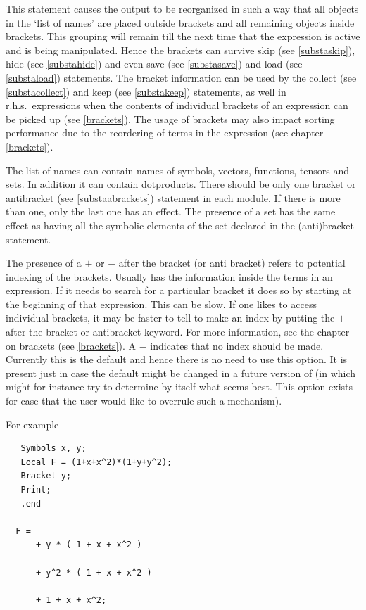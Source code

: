 \noindent This statement causes the output to be reorganized in such a way 
that all objects in the `list of names' are placed outside 
brackets and all remaining objects inside 
brackets. This grouping will remain till the next time that 
the expression is active and is being manipulated. Hence the brackets can 
survive skip (see \ref{substaskip}), hide (see \ref{substahide}) and even 
save (see \ref{substasave}) and load (see \ref{substaload}) statements. The 
bracket information can be used by the collect (see \ref{substacollect}) 
and keep (see \ref{substakeep}) statements, as well in r.h.s.\ expressions 
when the contents of individual brackets of an expression can be picked up 
(see \ref{brackets}). The usage of brackets may also impact sorting
performance due to the reordering of terms in the expression (see 
chapter \ref{brackets}). \vspace{4mm}

\noindent The list of names can contain names of symbols, vectors, 
functions, tensors and sets. In addition it can contain dotproducts. There 
should be only one bracket or antibracket (see \ref{substaabrackets}) 
statement in each module. If there is more than one, only the last one has 
an effect. The presence of a set has the same effect as having all the 
symbolic elements of the set declared in the (anti)bracket 
statement.\vspace{4mm}

\noindent The presence of a $+$ or $-$ after the bracket (or anti bracket) 
refers to potential indexing of the brackets. 
Usually {\FORM} has the information inside the terms in an expression. If 
it needs to search for a particular bracket it does so by starting at the 
beginning of that expression. This can be slow. If one likes to access 
individual brackets, it may be faster to tell {\FORM} to make an index by 
putting the $+$ after the bracket or antibracket keyword. For more 
information, see the chapter on brackets (see \ref{brackets}). A $-$ 
indicates that no index should be made. Currently this is the default and 
hence there is no need to use this option. It is present just in case the 
default might be changed in a future version of {\FORM} (in which {\FORM} 
might for instance try to determine by itself what seems best. This option 
exists for case that the user would like to overrule such a mechanism). 
\vspace{4mm}

\noindent For example
\begin{verbatim}
   Symbols x, y;
   Local F = (1+x+x^2)*(1+y+y^2);
   Bracket y;
   Print;
   .end

  F =
      + y * ( 1 + x + x^2 )

      + y^2 * ( 1 + x + x^2 )

      + 1 + x + x^2;
\end{verbatim}

